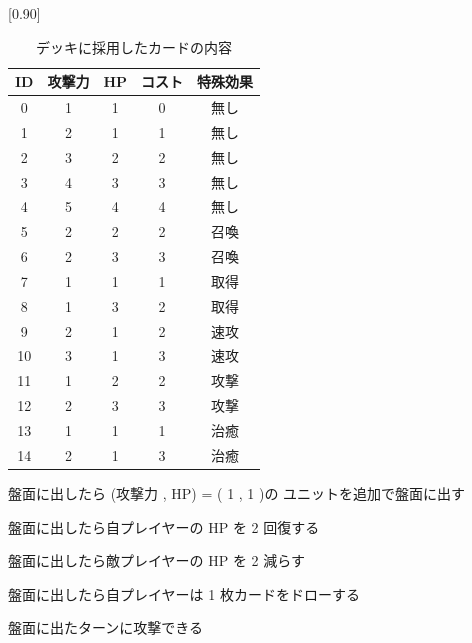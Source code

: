 \documentclass[twocolumn]{jarticle}
\begin{document}
\begin{table}[t]
  \centering
  \small
  \caption{デッキに採用したカードの内容}
  \label{table:deck}
  \vspace{-0.3cm}
  \scalebox{0.90}[0.90]{
    \begin{tabular}{|c|c|c|c|c|}
      \hline
      ID & 攻撃力 & HP & コスト & 特殊効果 \\ \hline
      0 & 1 & 1 & 0 & 無し \\ \hline
      1 & 2 & 1 & 1 & 無し \\ \hline
      2 & 3 & 2 & 2 & 無し \\ \hline
      3 & 4 & 3 & 3 & 無し \\ \hline
      4 & 5 & 4 & 4 & 無し \\ \hline
      5 & 2 & 2 & 2 & 召喚 \\ \hline
      6 & 2 & 3 & 3 & 召喚 \\ \hline
      7 & 1 & 1 & 1 & 取得 \\ \hline
      8 & 1 & 3 & 2 & 取得 \\ \hline
      9 & 2 & 1 & 2 & 速攻 \\ \hline
      10 & 3 & 1 & 3 & 速攻 \\ \hline
      11 & 1 & 2 & 2 & 攻撃 \\ \hline
      12 & 2 & 3 & 3 & 攻撃 \\ \hline
      13 & 1 & 1 & 1 & 治癒 \\ \hline
      14 & 2 & 1 & 3 & 治癒 \\ \hline
      \end{tabular}
  }
  
\end{table}

  \begin{description}
    \setlength{\itemsep}{0cm} %
    \small
    \item[召喚 :]  盤面に出したら (攻撃力 , HP) = ( 1 , 1 )の
    ユニットを追加で盤面に出す
    \item[治癒 :]  盤面に出したら自プレイヤーの HP を 2 回復する
    \item[攻撃 :]  盤面に出したら敵プレイヤーの HP を 2 減らす
    \item[取得 :]  盤面に出したら自プレイヤーは 1 枚カードをドローする
    \item[速攻 :]  盤面に出たターンに攻撃できる
  \end{description}
\end{document}
